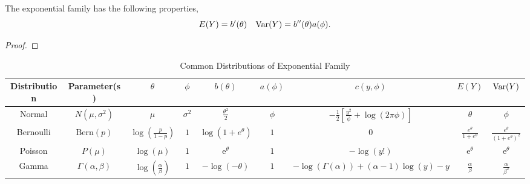 \begin{property}
	The exponential family has the following properties,
	\begin{equation*}
		E(Y)=b^{\prime}(\theta)\quad\mathrm{Var}(Y)=b^{\prime\prime}(\theta)a(\phi).
	\end{equation*}
\end{property}

\begin{proof}

\end{proof}

\begin{landscape}
	\begin{table}[hpt]
		\centering
		\caption{Common Distributions of Exponential Family}
		\begin{tabular}{ccccccccc}
			\toprule
			Distribution & Parameter(s)           & $\theta$                                & $\phi$       & $b(\theta)$                     & $a(\phi)$ & $c(y,\phi)$                                                   & $E(Y)$                            & $\mathrm{Var}(Y)$                                          \\
			\midrule
			Normal       & $N(\mu,\sigma^2)$      & $\mu$                                   & $\sigma^{2}$ & $\frac{\theta^{2}}{2}$          & $\phi$    & $-\frac{1}{2}\left[\frac{y^{2}}{\phi}+\log (2\pi\phi)\right]$ & $\theta$                          & $\phi$                                             \\
			Bernoulli    & $\text{Bern}(p)$       & $\log\left(\frac{p}{1-p}\right)$        & $1$          & $\log\left(1+e^{\theta}\right)$ & $1$       & $0$                                                           & $\frac{e^{\theta}}{1+e^{\theta}}$ & $\frac{e^{\theta}}{\left(1+e^{\theta}\right)^{2}}$ \\
			Poisson      & $P(\mu)$               & $\log(\mu)$                             & $1$          & $\mathrm{e}^{\theta}$           & $1$       & $-\log(y!)$                                                   & $\mathrm{e}^{\theta}$             & $\mathrm{e}^{\theta}$                              \\
			Gamma        & $\Gamma(\alpha,\beta)$ & $\log\left(\frac{\alpha}{\beta}\right)$ & $1$          & $-\log(-\theta)$                & $1$       & $-\log\left(\Gamma(\alpha)\right)+(\alpha-1)\log(y)-y$        & $\frac{\alpha}{\beta}$            & $\frac{\alpha}{\beta^{2}}$                         \\
			\bottomrule
		\end{tabular}
	\end{table}
\end{landscape}

